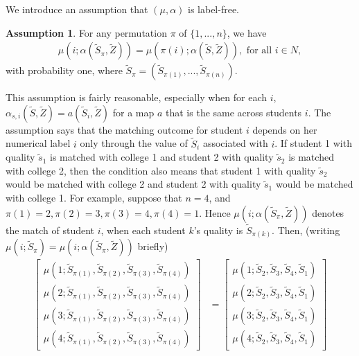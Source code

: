 \documentclass[12pt, fullpage]{amsart}
\theoremstyle{definition}
\theoremstyle{definition}
\newtheorem{assumption}{Assumption}[section]
\theoremstyle{definition}
\begin{document}
\begin{bibunit}[econometrica]
We introduce an assumption that $(\mu, \alpha)$ is label-free.
\begin{assumption}
	\label{assump: symmetry}
	For any permutation $\pi$ of $\{1,...,n\}$, we have
	\begin{align}
		\label{matching}
		\mu(i; \alpha(\tilde S_\pi, \tilde Z)) = \mu(\pi(i); \alpha(\tilde S, \tilde Z)), \text{ for all } i \in N,
	\end{align}
    with probability one, where $\tilde S_\pi = (\tilde S_{\pi(1)},...,\tilde S_{\pi(n)})$.
\end{assumption}
This assumption is fairly reasonable, especially when for each $i$, $\alpha_{s,i}(\tilde S,\tilde Z) = a(\tilde S_i,\tilde Z)$ for a map $a$ that is the same across students $i$. The assumption says that the matching outcome for student $i$ depends on her numerical label $i$ only through the value of $\tilde S_i$ associated with $i$. If student 1 with quality $\tilde s_1$ is matched with college 1 and student 2 with quality $\tilde s_2$ is matched with college 2, then the condition also means that student 1 with quality $\tilde s_2$ would be matched with college 2 and student 2 with quality $\tilde s_1$ would be matched with college 1. For example, suppose that $n = 4$, and $\pi(1) = 2, \pi(2) = 3, \pi(3) = 4, \pi(4) = 1$. Hence $\mu(i;\alpha(\tilde S_\pi, \tilde Z))$ denotes the match of student $i$, when each student $k$'s quality is $\tilde S_{\pi(k)}$. Then, (writing $\mu(i;\tilde S_\pi) = \mu(i;\alpha(\tilde S_\pi, \tilde Z))$ briefly)
\begin{align*}
	\begin{bmatrix}
		\mu(1;\tilde S_{\pi(1)},\tilde S_{\pi(2)},\tilde S_{\pi(3)},\tilde S_{\pi(4)}) \\
		\mu(2;\tilde S_{\pi(1)},\tilde S_{\pi(2)},\tilde S_{\pi(3)},\tilde S_{\pi(4)}) \\
		\mu(3;\tilde S_{\pi(1)},\tilde S_{\pi(2)},\tilde S_{\pi(3)},\tilde S_{\pi(4)}) \\
		\mu(4;\tilde S_{\pi(1)},\tilde S_{\pi(2)},\tilde S_{\pi(3)},\tilde S_{\pi(4)})
	\end{bmatrix}
	&= \begin{bmatrix}
		\mu(1;\tilde S_{2},\tilde S_{3},\tilde S_{4},\tilde S_{1}) \\
		\mu(2;\tilde S_{2},\tilde S_{3},\tilde S_{4},\tilde S_{1}) \\
		\mu(3;\tilde S_{2},\tilde S_{3},\tilde S_{4},\tilde S_{1}) \\
		\mu(4;\tilde S_{2},\tilde S_{3},\tilde S_{4},\tilde S_{1})
	\end{bmatrix}\\

\end{align*}
\end{bibunit}
\end{document}
